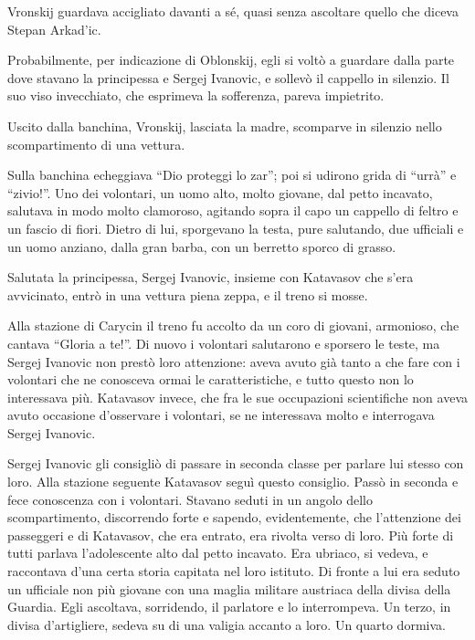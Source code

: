Vronskij guardava accigliato davanti a sé, quasi senza ascoltare quello che diceva Stepan Arkad'ic. 

Probabilmente, per indicazione di Oblonskij, egli si voltò a guardare dalla parte dove stavano la principessa e Sergej Ivanovic, e sollevò il cappello in silenzio. Il suo viso invecchiato, che esprimeva la sofferenza, pareva impietrito. 

Uscito dalla banchina, Vronskij, lasciata la madre, scomparve in silenzio nello scompartimento di una vettura. 

Sulla banchina echeggiava ``Dio proteggi lo zar''; poi si udirono grida di ``urrà'' e ``zivio!''. Uno dei volontari, un uomo alto, molto giovane, dal petto incavato, salutava in modo molto clamoroso, agitando sopra il capo un cappello di feltro e un fascio di fiori. Dietro di lui, sporgevano la testa, pure salutando, due ufficiali e un uomo anziano, dalla gran barba, con un berretto sporco di grasso. 

Salutata la principessa, Sergej Ivanovic, insieme con Katavasov che s'era avvicinato, entrò in una vettura piena zeppa, e il treno si mosse. 

Alla stazione di Carycin il treno fu accolto da un coro di giovani, armonioso, che cantava ``Gloria a te!''. Di nuovo i volontari salutarono e sporsero le teste, ma Sergej Ivanovic non prestò loro attenzione: aveva avuto già tanto a che fare con i volontari che ne conosceva ormai le caratteristiche, e tutto questo non lo interessava più. Katavasov invece, che fra le sue occupazioni scientifiche non aveva avuto occasione d'osservare i volontari, se ne interessava molto e interrogava Sergej Ivanovic. 

Sergej Ivanovic gli consigliò di passare in seconda classe per parlare lui stesso con loro. Alla stazione seguente Katavasov seguì questo consiglio. Passò in seconda e fece conoscenza con i volontari. Stavano seduti in un angolo dello scompartimento, discorrendo forte e sapendo, evidentemente, che l'attenzione dei passeggeri e di Katavasov, che era entrato, era rivolta verso di loro. Più forte di tutti parlava l'adolescente alto dal petto incavato. Era ubriaco, si vedeva, e raccontava d'una certa storia capitata nel loro istituto. Di fronte a lui era seduto un ufficiale non più giovane con una maglia militare austriaca della divisa della Guardia. Egli ascoltava, sorridendo, il parlatore e lo interrompeva. Un terzo, in divisa d'artigliere, sedeva su di una valigia accanto a loro. Un quarto dormiva. 

